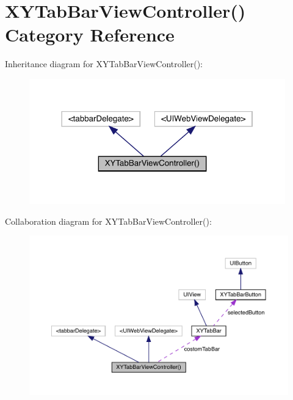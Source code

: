 \hypertarget{category_x_y_tab_bar_view_controller_07_08}{}\section{X\+Y\+Tab\+Bar\+View\+Controller() Category Reference}
\label{category_x_y_tab_bar_view_controller_07_08}


Inheritance diagram for X\+Y\+Tab\+Bar\+View\+Controller()\+:\nopagebreak
\begin{figure}[H]
\begin{center}
\leavevmode
\includegraphics[width=314pt]{category_x_y_tab_bar_view_controller_07_08__inherit__graph}
\end{center}
\end{figure}


Collaboration diagram for X\+Y\+Tab\+Bar\+View\+Controller()\+:\nopagebreak
\begin{figure}[H]
\begin{center}
\leavevmode
\includegraphics[width=350pt]{category_x_y_tab_bar_view_controller_07_08__coll__graph}
\end{center}
\end{figure}
